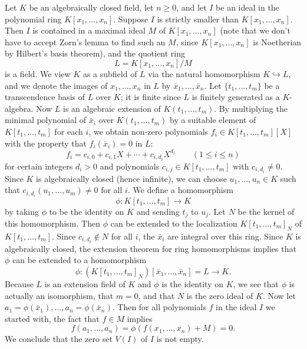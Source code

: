 \documentclass[12pt]{article}
\begin{document}
Let $K$ be an algebraically closed field, let $n\ge 0$, and let $I$ be
an ideal in the polynomial ring $K[x_1,\ldots,x_n]$.  Suppose $I$ is
strictly smaller than $K[x_1,\ldots,x_n]$.  Then $I$ is contained in a
maximal ideal $M$ of $K[x_1,\ldots,x_n]$ (note that we don't have to
accept Zorn's lemma to find such an $M$, since $K[x_1,\ldots,x_n]$ is
Noetherian by Hilbert's basis theorem), and the quotient ring
$$
L=K[x_1,\ldots,x_n]/M
$$
is a field.  We view $K$ as a subfield of $L$ via the natural
homomorphism $K\hookrightarrow L$, and we denote the images of
$x_1,\ldots,x_n$ in $L$ by $\bar x_1,\ldots,\bar x_n$.  Let
$\{t_1,\ldots,t_m\}$ be a transcendence basis of $L$ over $K$; it is
finite since $L$ is finitely generated as a $K$-algebra.  Now $L$ is
an algebraic extension of $K(t_1,\ldots,t_m)$.  By multiplying the
minimal polynomial of $\bar x_i$ over $K(t_1,\ldots,t_m)$ by a
suitable element of $K[t_1,\ldots,t_m]$ for each $i$, we obtain
non-zero polynomials $f_i\in K[t_1,\ldots,t_m][X]$ with the
property that $f_i(\bar x_i)=0$ in $L$:
$$
f_i=c_{i,0}+c_{i,1}X+\cdots+c_{i,d_i}X^{d_i}
\qquad(1\le i\le n)
$$
for certain integers $d_i>0$ and polynomials $c_{i,j}\in                                  
K[t_1,\ldots,t_m]$ with $c_{i,d_i}\ne 0$.  Since $K$ is algebraically
closed (hence infinite), we can choose $u_1,\ldots,u_n\in K$ such that
$c_{i,d_i}(u_1,\ldots,u_m)\ne 0$ for all $i$.  We define a homomorphism
$$
\phi\colon K[t_1,\ldots,t_m] \longrightarrow K
$$
by taking $\phi$ to be the identity on $K$ and sending $t_j$ to $u_j$.
Let $N$ be the kernel of this homomorphism.  Then $\phi$ can be
extended to the localization $K[t_1,\ldots,t_m]_N$ of
$K[t_1,\ldots,t_m]$.  Since $c_{i,d_i}\not\in N$ for all $i$, the
$\bar x_i$ are integral over this ring.  Since $K$ is algebraically
closed, the extension theorem for ring homomorphisms implies that
$\phi$ can be extended to a homomorphism
$$
\phi\colon(K[t_1,\ldots,t_m]_N)[\bar x_1,\ldots,\bar x_n]=L
\longrightarrow K.
$$
Because $L$ is an extension field of $K$ and $\phi$ is the identity on
$K$, we see that $\phi$ is actually an isomorphism, that $m=0$, and
that $N$ is the zero ideal of $K$.  Now let $a_1=\phi(\bar                                
x_1),\ldots,a_n=\phi(\bar x_n)$.  Then for all polynomials $f$ in the
ideal $I$ we started with, the fact that $f\in M$ implies
$$
f(a_1,\ldots,a_n)=\phi(f(x_1,\ldots,x_n)+M)=0.
$$
We conclude that the zero set $V(I)$ of $I$ is not empty.
\end{document}
